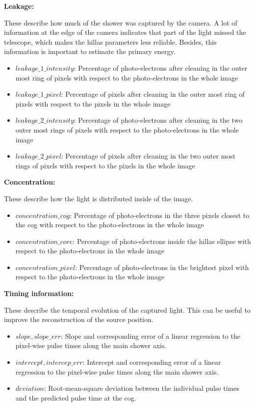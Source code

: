\textbf{Leakage:}

These describe how much of the shower was captured by the camera.
A lot of information at the edge of the camera indicates that part of the light missed the telescope, 
which makes the hillas parameters less reliable.
Besides, this information is important to estimate the primary energy.

\begin{itemize}
    \item{$leakage\_1\_intensity$: Percentage of photo-electrons after cleaning in the outer most ring of pixels with respect to the photo-electrons in the whole image}
    \item{$leakage\_1\_pixel$: Percentage of pixels after cleaning in the outer most ring of pixels with respect to the pixels in the whole image}
    \item{$leakage\_2\_intensity$: Percentage of photo-electrons after cleaning in the two outer most rings of pixels with respect to the photo-electrons in the whole image}
    \item{$leakage\_2\_pixel$: Percentage of pixels after cleaning in the two outer most rings of pixels with respect to the pixels in the whole image}
\end{itemize}

\textbf{Concentration:}

These describe how the light is distributed inside of the image.
\begin{itemize}
    \item{$concentration\_cog$: Percentage of photo-electrons in the three pixels closest to the cog with respect to the photo-electrons in the whole image}
    \item{$concentration\_core$: Percentage of photo-electrons inside the hillas ellipse with respect to the photo-electrons in the whole image}
    \item{$concentration\_pixel$: Percentage of photo-electrons in the brightest pixel with respect to the photo-electrons in the whole image}
\end{itemize}

\textbf{Timing information:}

These describe the temporal evolution of the captured light.
This can be useful to improve the reconstruction of the source position.
\begin{itemize}
    \item{$slope, slope\_err$: Slope and corresponding  error of a linear regression to the pixel-wise pulse times along the main shower axis.}
    \item{$intercept, intercep\_err$: Intercept and corresponding  error of a linear regression to the pixel-wise pulse times along the main shower axis.}
    \item{$deviation$: Root-mean-square deviation between the individual pulse times and the predicted pulse time at the cog.}
\end{itemize}


